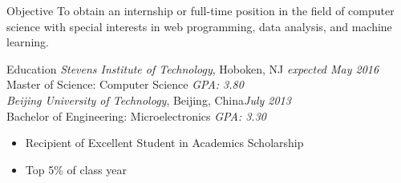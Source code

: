 \documentclass{resume} 		%
\begin{document}

\begin{rSection}{Objective}
To obtain an internship or full-time position in the field of computer science with special interests in web programming, data analysis, and machine learning.
\end{rSection}


\begin{rSection}{Education}
{\sl Stevens Institute of Technology}, Hoboken, NJ \hfill {\em expected May 2016} \\ 	%
Master of Science: Computer Science {\em GPA: 3.80}\\
{\sl Beijing University of Technology}, Beijing, China\hfill {\em July 2013} \\ 
Bachelor of Engineering: Microelectronics	   {\em GPA: 3.30 }
\begin{itemize} 
 \setlength\itemsep{-0.5em}		%
 \renewcommand\labelitemi{--}		%
\item Recipient of Excellent Student in Academics Scholarship
\item Top 5\% of class year
\end{itemize} 
\end{rSection}

\end{document}
